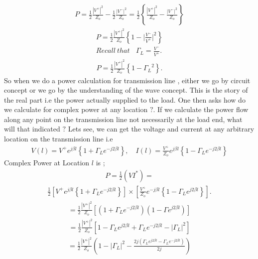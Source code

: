 \begin{align*} 
P= \frac{1}{2} \frac{ { |V^+ | }^2}{Z_o} -\frac{1}{2} \frac{ {|V^- |}^2 }{Z_o} = \frac{1}{2} \left\lbrace \frac{ { | V^+ | }^2}{Z_o} -\frac{ {|V^- |}^2 }{Z_o} \right\rbrace
\end{align*}
 \begin{align*} 
P= \frac{1}{2} \frac{ { | V^+ | } ^2}{Z_o} \left\lbrace 1 - { | {\frac{V^-}{V^+}|^2}}\right\rbrace\\
Recall \ that\ \ \ \  \Gamma_L =\frac{V^-}{V^+}.
 \end{align*}
 \begin{align*}
 P=\frac{1}{2} \frac{{| V^+ |}^2}{Z_o} \left\lbrace 1 - { \Gamma_L }^2 \right\rbrace.
\end{align*}
So when we do a power calculation for transmission line , either we go by circuit concept or we go by the understanding of the wave concept. This is the story of the real part i.e the power actually supplied to the load. One then asks how do we calculate for complex power at any location $?$. If we calculate the power flow along any point on the transmission line not necessarily at the load end, what will that indicated $?$ Lets see, we can get the voltage and current at any arbitrary location on the transmission line i.e
\begin{align*} 
V(l) = V^+ e^{j\beta l} \left\lbrace 1 + \Gamma_L e^{-j2\beta l} \right\rbrace ,\quad I(l) = \frac{V^+}{Z_o} e^{j\beta l} \left\lbrace 1 - \Gamma_L e^{-j2\beta l} \right\rbrace
\end{align*}
Complex Power at Location $l$ is ;
\begin{align*}
P = \frac{1}{2} (V I^*) =
\end{align*}
\begin{align*}
\frac{1}{2} [V^+ e^{j\beta l} \left\lbrace 1 + \Gamma_L e^{-j2\beta l} \right\rbrace ] \times [\frac{V^+}{Z_o} e^{-j\beta l} \left\lbrace 1 - \Gamma_L e^{j2\beta l} \right\rbrace].
\end{align*}
\begin{align*}
=\frac{1}{2} \frac{{| V ^+ |}^2}{Z_o} [( 1 + \Gamma_L e^{-j2\beta l})(1 - \Gamma e^{j2\beta l})]
\end{align*}
\begin{align*}
= \frac{1}{2} \frac{{ | V^+ | }^2}{Z_o} [ 1 - \Gamma_L e^{j2\beta l} + \Gamma_L e^ {-j2\beta l} - {| \Gamma_L | ^2}]
\end{align*}
\begin{align*} 
=\frac{1}{2} \frac{{ | V^+ | }^2}{Z_o} ( 1 - {|\Gamma_L}|^2 -\frac{2j(\Gamma_L e^{j2\beta l} - \Gamma_L e^{-j2\beta l})}{2j} )
\end{align*}
